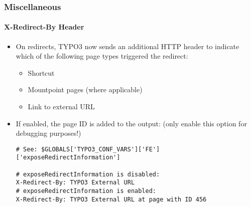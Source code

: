 %

\begin{frame}[fragile]
	\frametitle{Miscellaneous}
	\framesubtitle{X-Redirect-By Header}


	\begin{itemize}
		\item On redirects, TYPO3 now sends an additional HTTP header to indicate
			which of the following page types triggered the redirect:
			\begin{itemize}\small
				\item Shortcut
				\item Mountpoint pages (where applicable)
				\item Link to external URL
			\end{itemize}\normalsize
		\item If enabled, the page ID is added to the output:\newline
			\smaller(only enable this option for debugging purposes!)\normalsize
\begin{lstlisting}
# See: $GLOBALS['TYPO3_CONF_VARS']['FE']['exposeRedirectInformation']

# exposeRedirectInformation is disabled:
X-Redirect-By: TYPO3 External URL
# exposeRedirectInformation is enabled:
X-Redirect-By: TYPO3 External URL at page with ID 456
\end{lstlisting}

	\end{itemize}

\end{frame}

